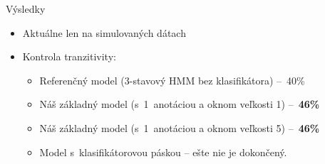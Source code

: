 \documentclass[xcolor=dvipsnames, compress, 12pt, t]{beamer}
\begin{document}





\begin{frame}{Výsledky}
  \begin{itemize}
    \item Aktuálne len na simulovaných dátach
    \item Kontrola tranzitivity:
    \begin{itemize}
      \item Referenčný model (3-stavový HMM bez klasifikátora) --~40\%
      \item Náš základný model (s~1~anotáciou a oknom veľkosti 1) --~\textbf{46\%}
      \item Náš základný model (s~1~anotáciou a oknom veľkosti 5) --~\textbf{46\%}
      \item Model s~klasifikátorovou páskou -- ešte nie je dokončený.
    \end{itemize}
  \end{itemize}
\end{frame}
\end{document}
